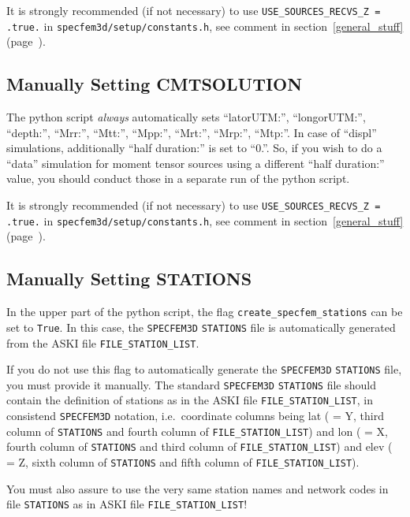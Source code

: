\documentclass[12pt,a4paper]{article}
\newcommand{\lcode}[1]{\nolinkurl{#1}}
\newcommand{\lcodetitle}[1]{ {\ttfamily #1} }
\newcommand{\ASKI}{ {\ttfamily ASKI} }
\newcommand{\myref}[1]{\ref{#1} (page~\pageref{#1})}
\begin{document}
It is strongly recommended (if not necessary) to use \lcode{USE_SOURCES_RECVS_Z = .true.} in \lcode{specfem3d/setup/constants.h},
see comment in section~\myref{general_stuff}.
%
\subsection{Manually Setting \lcodetitle{CMTSOLUTION}}
%
The python script \emph{always} automatically sets ``latorUTM:'', ``longorUTM:'', ``depth:'', 
``Mrr:'', ``Mtt:'', ``Mpp:'', ``Mrt:'', ``Mrp:'', ``Mtp:''. In case of ``displ'' simulations, additionally 
``half duration:'' is set to ``0.''. So, if you wish to do a ``data'' simulation for moment tensor sources 
using a different ``half duration:'' value, you should conduct those in a separate run of the python script.

It is strongly recommended (if not necessary) to use \lcode{USE_SOURCES_RECVS_Z = .true.} in \lcode{specfem3d/setup/constants.h},
see comment in section~\myref{general_stuff}.
%
\subsection{Manually Setting \lcodetitle{STATIONS}}
%
In the upper part of the python script, the flag \lcode{create_specfem_stations} can be set to \lcode{True}.
In this case, the \lcode{SPECFEM3D} \lcode{STATIONS} file is automatically generated from the 
\ASKI{} file \lcode{FILE_STATION_LIST}.

If you do not use this flag to automatically generate the \lcode{SPECFEM3D} \lcode{STATIONS} file,
you must provide it manually.
The standard \lcode{SPECFEM3D} \lcode{STATIONS} file should contain the definition of stations as
in the \ASKI{} file \lcode{FILE_STATION_LIST}, in consistend \lcode{SPECFEM3D} notation, i.e.\ coordinate
columns being lat ( = Y, third column of \lcode{STATIONS} and fourth column of \lcode{FILE_STATION_LIST}) and 
lon ( = X, fourth column of \lcode{STATIONS} and third column of \lcode{FILE_STATION_LIST}) and 
elev ( = Z, sixth column of \lcode{STATIONS} and fifth column of \lcode{FILE_STATION_LIST}). 

You must also assure to use the very same station names and network codes in file \lcode{STATIONS} as in 
\ASKI{} file \lcode{FILE_STATION_LIST}!
\end{document}
